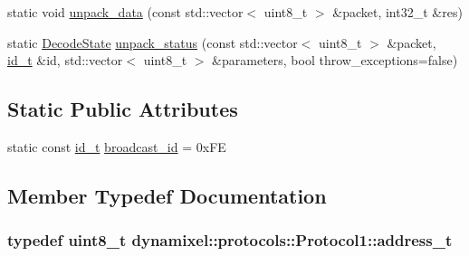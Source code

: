 \begin{DoxyCompactItemize}
\item 
static void \hyperlink{classdynamixel_1_1protocols_1_1_protocol1_ac5c7564982fadaeb0ff1e1d2163e4cea}{unpack\+\_\+data} (const std\+::vector$<$ uint8\+\_\+t $>$ \&packet, int32\+\_\+t \&res)
\item 
static \hyperlink{classdynamixel_1_1protocols_1_1_protocol1_a84867f282d00506d43ebca811925fbcc}{Decode\+State} \hyperlink{classdynamixel_1_1protocols_1_1_protocol1_a4f79051bd5a2d77fd30eadaa16740b77}{unpack\+\_\+status} (const std\+::vector$<$ uint8\+\_\+t $>$ \&packet, \hyperlink{classdynamixel_1_1protocols_1_1_protocol1_a1d4dfa22b01f80b1876d14f539d52b5c}{id\+\_\+t} \&id, std\+::vector$<$ uint8\+\_\+t $>$ \&parameters, bool throw\+\_\+exceptions=false)
\end{DoxyCompactItemize}
\subsection*{Static Public Attributes}
\begin{DoxyCompactItemize}
\item 
static const \hyperlink{classdynamixel_1_1protocols_1_1_protocol1_a1d4dfa22b01f80b1876d14f539d52b5c}{id\+\_\+t} \hyperlink{classdynamixel_1_1protocols_1_1_protocol1_ac14fd1ffbfadfccf29a923149f416de2}{broadcast\+\_\+id} = 0x\+FE
\end{DoxyCompactItemize}


\subsection{Member Typedef Documentation}
\subsubsection[{\texorpdfstring{address\+\_\+t}{address_t}}]{\setlength{\rightskip}{0pt plus 5cm}typedef uint8\+\_\+t {\bf dynamixel\+::protocols\+::\+Protocol1\+::address\+\_\+t}}\hypertarget{classdynamixel_1_1protocols_1_1_protocol1_a4383ba392b57ea00dd0273c6da5e8a65}{}\label{classdynamixel_1_1protocols_1_1_protocol1_a4383ba392b57ea00dd0273c6da5e8a65}
